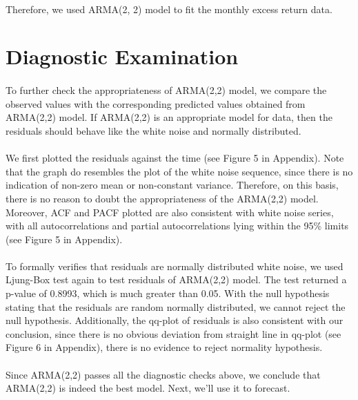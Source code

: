 \documentclass[10pt,letter]{article}
\begin{document}
\paragraph{} Therefore, we used ARMA(2, 2) model to fit the monthly excess return data.

\section*{Diagnostic Examination}
\paragraph{} To further check the appropriateness of ARMA(2,2) model, we compare the observed values with the corresponding predicted values obtained from ARMA(2,2) model. If ARMA(2,2) is an appropriate model for data, then the residuals should behave like the white noise and normally distributed. 
\paragraph{} We first plotted the residuals against the time (see Figure 5 in Appendix). Note that the graph do resembles the plot of the white noise sequence, since there is no indication of non-zero mean or non-constant variance. Therefore, on this basis, there is no reason to doubt the appropriateness of the ARMA(2,2) model. Moreover, ACF and PACF plotted are also consistent with white noise series, with all autocorrelations and partial autocorrelations lying within the 95\% limits (see Figure 5 in Appendix). 

\paragraph{} To formally verifies that residuals are normally distributed white noise, we used Ljung-Box test again to test residuals of ARMA(2,2) model. The test returned a p-value of 0.8993, which is much greater than 0.05. With the null hypothesis stating that the residuals are random normally distributed, we cannot reject the null hypothesis. Additionally, the qq-plot of residuals is also consistent with our conclusion, since there is no obvious deviation from straight line in qq-plot (see Figure 6 in Appendix), there is no evidence to reject normality hypothesis.
\paragraph{} Since ARMA(2,2) passes all the diagnostic checks above, we conclude that ARMA(2,2) is indeed the best model. Next, we'll use it to forecast. 
\end{document}
